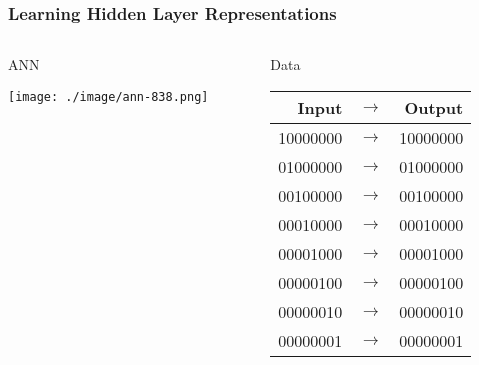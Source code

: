 \documentclass{beamer}
\begin{document}
\begin{frame}
\frametitle{Learning Hidden Layer Representations}
\label{sec-3-7}
\begin{columns}
\begin{column}{0.5\textwidth}
\begin{block}{ANN}
\label{sec-3-7-1}


\texttt{[image: ./image/ann-838.png]}
\end{block}
\end{column}
\begin{column}{0.5\textwidth}
\begin{block}{Data}
\label{sec-3-7-2}



\begin{center}
\begin{tabular}{rlr}
    Input  &  $\rightarrow$  &    Output  \\
\hline
 10000000  &  $\rightarrow$  &  10000000  \\
 01000000  &  $\rightarrow$  &  01000000  \\
 00100000  &  $\rightarrow$  &  00100000  \\
 00010000  &  $\rightarrow$  &  00010000  \\
 00001000  &  $\rightarrow$  &  00001000  \\
 00000100  &  $\rightarrow$  &  00000100  \\
 00000010  &  $\rightarrow$  &  00000010  \\
 00000001  &  $\rightarrow$  &  00000001  \\
\end{tabular}
\end{center}
\end{block}
\end{column}
\end{columns}
\end{frame}
\end{document}
